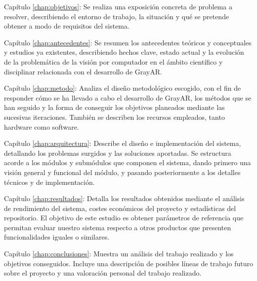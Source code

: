   \begin{definitionlist}
  \item[Capítulo \ref{chap:objetivos}: \nameref{chap:objetivos}] Se realiza una exposición concreta de problema a resolver, describiendo el entorno de trabajo, la situación y qué se pretende obtener a modo de requisitos del sistema.

  \item[Capítulo \ref{chap:antecedentes}: \nameref{chap:antecedentes}] Se resumen los antecedentes teóricos y conceptuales y estudios ya existentes, describiendo hechos clave, estado actual y la evolución de la problemática de la visión por computador en el ámbito científico y disciplinar relacionada con el desarrollo de GrayAR.

  \item[Capítulo \ref{chap:metodo}: \nameref{chap:metodo}] Analiza el diseño metodológico escogido, con el fin de responder cómo se ha llevado a cabo el desarrollo de GrayAR, los métodos que se han seguido y la forma de conseguir los objetivos planeados mediante las sucesivas iteraciones. También se describen los recursos empleados, tanto hardware como software.

  \item[Capítulo \ref{chap:arquitectura}: \nameref{chap:arquitectura}] Describe el diseño e implementación del sistema, detallando los problemas surgidos y las soluciones aportadas. Se estructura acorde a los módulos y submódulos que componen el sistema, dando primero una visión general y funcional del módulo, y pasando posteriormente a los detalles técnicos y de implementación. 

  \item[Capítulo \ref{chap:resultados}: \nameref{chap:resultados}] Detalla los resultados obtenidos mediante el análisis de rendimiento del sistema, costes económicos del proyecto y estadísticas del repositorio. El objetivo de este estudio es obtener parámetros de referencia que permitan evaluar nuestro sistema respecto a otros productos que presenten funcionalidades iguales o similares.

  \item[Capítulo \ref{chap:conclusiones}: \nameref{chap:conclusiones}] Muestra un análisis del trabajo realizado y los objetivos conseguidos. Incluye una descripción de posibles líneas de trabajo futuro sobre el proyecto y una valoración personal del trabajo realizado.

  \end{definitionlist}



